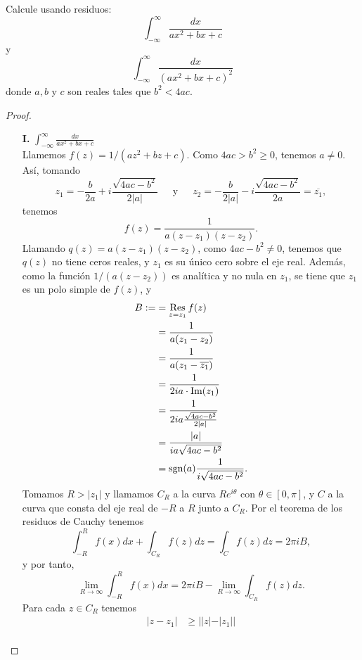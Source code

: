 \begin{Ejc}
   Calcule usando residuos:
   $$
   \int_{-\infty}^{\infty}\frac{dx}{ax^2+bx+c} 
   $$
   y
   $$
   \int_{-\infty}^{\infty}\frac{dx}{\left( ax^2+bx+c\right)^2}
   $$
   donde $a, b$ y $c$ son reales tales que $b^2<4ac$.
\end{Ejc}
\begin{proof}
   \begin{itemize}
      \item[\textbf{I.}]$\int_{-\infty}^{\infty}\frac{dx}{ax^2+bx+c}$\\
         Llamemos $f(z)=1/(az^2+bz+c)$. Como $4ac>b^2\geq0$, tenemos $a\neq 0$. Así, tomando
         $$
         z_1=-\frac{b}{2a}+i\frac{\sqrt{4ac-b^2}}{2|a|}\phantom{000}\text{y}\phantom{000}z_2=-\frac{b}{2|a|}-i\frac{\sqrt{4ac-b^2}}{2a}=\overline{z_1},
         $$
         tenemos
         $$
         f(z)=\frac{1}{a(z-z_1)(z-z_2)}.
         $$
         Llamando $q(z)=a(z-z_1)(z-z_2)$, como $4ac-b^2\neq 0$, tenemos que $q(z)$ no tiene ceros reales, y $z_1$ es su único cero sobre el eje real. Además, como la función $1/(a(z-z_2))$ es analítica y no nula en $z_1$, se tiene que $z_1$ es un polo simple de $f(z)$, y
         $$
         \begin{aligned}
            B:=&=\mathop{\mathrm{Res}}\limits_{z=z_1}f(z)\\
               &=\frac{1}{a(z_1-z_2)}\\
               &=\frac{1}{a(z_1-\overline{z_1})}\\
               &=\frac{1}{2ia\cdot\text{Im}(z_1)}\\
               &=\frac{1}{2ia\frac{\sqrt{4ac-b^2}}{2|a|}}\\
               &=\frac{|a|}{ia\sqrt{4ac-b^2}}\\
               &=\sgn(a)\frac{1}{i\sqrt{4ac-b^2}}.
         \end{aligned}
         $$
         Tomamos $R>|z_1|$ y llamamos $C_R$ a la curva $Re^{i\theta}$ con $\theta\in[0,\pi]$, y $C$ a la curva que consta del eje real de $-R$ a $R$ junto a $C_R$. Por el teorema de los residuos de Cauchy tenemos
         $$
         \int_{-R}^{R}f(x)dx+\int_{C_R}f(z)dz=\int_{C}f(z)dz=2\pi i B,
         $$
         y por tanto,
         $$
         \lim_{R\to\infty}\int_{-R}^{R}f(x)dx=2\pi i B - \lim_{R\to\infty}\int_{C_R}f(z)dz.
         $$
         Para cada $z\in C_R$ tenemos
         $$
         \begin{aligned}
            |z-z_1|&\geq ||z|-|z_1||\\

\end{aligned}$$
\end{itemize}
\end{proof}
